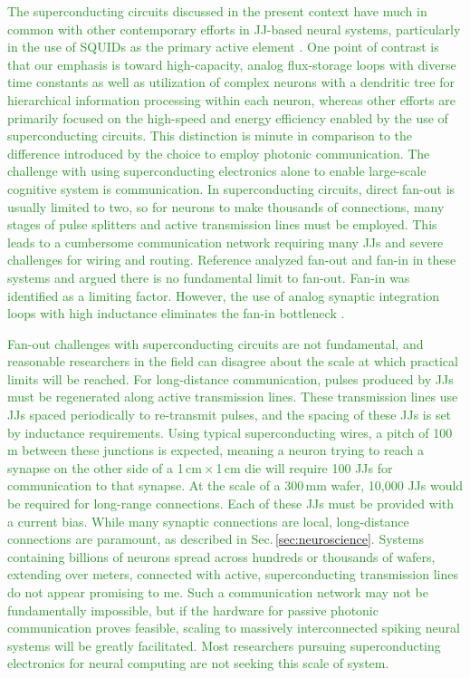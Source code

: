 \documentclass[twocolumn]{article}
\newcommand{\onlinecite}[1]{\hspace{-1 ex} \nocite{#1}\citenum{#1}}
\begin{document}
\textcolor{ForestGreen}{The superconducting circuits discussed in the present context have much in common with other contemporary efforts in JJ-based neural systems, particularly in the use of SQUIDs as the primary active element \cite{crsc2010,scdo2018b}. One point of contrast is that our emphasis is toward high-capacity, analog flux-storage loops with diverse time constants as well as utilization of complex neurons with a dendritic tree for hierarchical information processing within each neuron, whereas other efforts are primarily focused on the high-speed \cite{sele2017} and energy efficiency \cite{klsc2018} enabled by the use of superconducting circuits. This distinction is minute in comparison to the difference introduced by the choice to employ photonic communication. The challenge with using superconducting electronics alone to enable large-scale cognitive system is communication. In superconducting circuits, direct fan-out is usually limited to two, so for neurons to make thousands of connections, many stages of pulse splitters and active transmission lines must be employed. This leads to a cumbersome communication network requiring many JJs and severe challenges for wiring and routing. Reference \onlinecite{scse2020} analyzed fan-out and fan-in in these systems and argued there is no fundamental limit to fan-out. Fan-in was identified as a limiting factor. However, the use of analog synaptic integration loops with high inductance eliminates the fan-in bottleneck \cite{sh2019}.}

\textcolor{ForestGreen}{Fan-out challenges with superconducting circuits are not fundamental, and reasonable researchers in the field can disagree about the scale at which practical limits will be reached. For long-distance communication, pulses produced by JJs must be regenerated along active transmission lines. These transmission lines use JJs spaced periodically to re-transmit pulses, and the spacing of these JJs is set by inductance requirements. Using typical superconducting wires, a pitch of 100\,\textmu m between these junctions is expected, meaning a neuron trying to reach a synapse on the other side of a 1\,cm\,$\times$\,1\,cm die will require 100 JJs for communication to that synapse. At the scale of a 300\,mm wafer, 10,000 JJs would be required for long-range connections. Each of these JJs must be provided with a current bias. While many synaptic connections are local, long-distance connections are paramount, as described in Sec.\,\ref{sec:neuroscience}. Systems containing billions of neurons spread across hundreds or thousands of wafers, extending over meters, connected with active, superconducting transmission lines do not appear promising to me. Such a communication network may not be fundamentally impossible, but if the hardware for passive photonic communication proves feasible, scaling to massively interconnected spiking neural systems will be greatly facilitated. Most researchers pursuing superconducting electronics for neural computing are not seeking this scale of system.}
\end{document}

